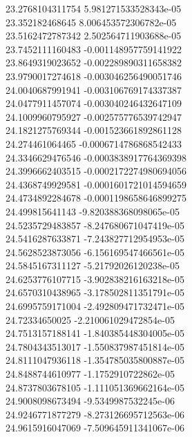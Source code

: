 {23.2768104311754 5.981271533528343e-05 \\
23.352182468645 8.006453572306782e-05 \\
23.5162472787342 2.502564711903688e-05 \\
23.7452111160483 -0.001148957759141922 \\
23.8649319023652 -0.002289890311658382 \\
23.9790017274618 -0.003046256490051746 \\
24.0040687991941 -0.003106769174337387 \\
24.0477911457074 -0.003040246432647109 \\
24.1009960795927 -0.002575776539742947 \\
24.1821275769344 -0.001523661892861128 \\
24.274461064465 -0.0006714786868542433 \\
24.3346629476546 -0.0003838917764369398 \\
24.3996662403515 -0.0002172274980694056 \\
24.4368749929581 -0.0001601721014594659 \\
24.4734892284678 -0.0001198658646899275 \\
24.499815641143 -9.820388368098065e-05 \\
24.5235729483857 -8.247680671047419e-05 \\
24.5416287633871 -7.243827712954953e-05 \\
24.5628523873056 -6.156169547466561e-05 \\
24.5845167311127 -5.21792026120238e-05 \\
24.6253776107715 -3.902838216163218e-05 \\
24.6570310438965 -3.178502811351791e-05 \\
24.6995759171004 -2.492809471732471e-05 \\
24.72334650025 -2.210061029472854e-05 \\
24.7513157188141 -1.840385448304005e-05 \\
24.7804343513017 -1.550837987451814e-05 \\
24.8111047936118 -1.354785035800887e-05 \\
24.8488744610977 -1.1752910722862e-05 \\
24.8737803678105 -1.111051369662164e-05 \\
24.9008098673494 -9.5349987532245e-06 \\
24.9246771877279 -8.273126695712563e-06 \\
24.9615916047069 -7.509645911341067e-06 \\
}
